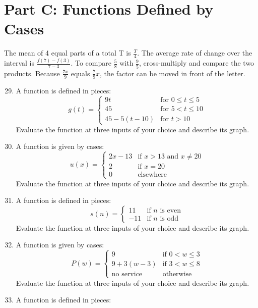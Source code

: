 \documentclass[11pt]{article}
\begin{document}
\section*{Part C: Functions Defined by Cases}
The mean of 4 equal parts of a total T is \label{eq050}$\frac{T}{4}$. The average rate of change over the interval is \label{eq051}$\frac{f(7) - f(3)}{7 - 3}$. To compare \label{eq052}$\frac{5}{8}$ with \label{eq053}$\frac{9}{5}$, cross-multiply and compare the two products. Because \label{eq054}$\frac{7x}{9}$ equals \label{eq055}$\frac{7}{9}x$, the factor can be moved in front of the letter.
\begin{enumerate}
\setcounter{enumi}{28}
\setlength{\itemsep}{8pt}
\item A function is defined in pieces:
\label{eq056}\[
  g(t) = \begin{cases} 9t & \text{for } 0 \le t \le 5 \\ 45 & \text{for } 5 < t \le 10 \\ 45 - 5(t - 10) & \text{for } t > 10 \end{cases}
\]
Evaluate the function at three inputs of your choice and describe its graph.
\item A function is given by cases:
\label{eq057}\[
  u(x) = \begin{cases} 2x - 13 & \text{if } x > 13 \text{ and } x \ne 20 \\ 2 & \text{if } x = 20 \\ 0 & \text{elsewhere} \end{cases}
\]
Evaluate the function at three inputs of your choice and describe its graph.
\item A function is defined in pieces:
\label{eq058}\[
  s(n) = \begin{cases} 11 & \text{if } n \text{ is even} \\ -11 & \text{if } n \text{ is odd} \end{cases}
\]
Evaluate the function at three inputs of your choice and describe its graph.
\item A function is given by cases:
\label{eq059}\[
  P(w) = \begin{cases} 9 & \text{if } 0 < w \le 3 \\ 9 + 3(w - 3) & \text{if } 3 < w \le 8 \\ \text{no service} & \text{otherwise} \end{cases}
\]
Evaluate the function at three inputs of your choice and describe its graph.
\item A function is defined in pieces:

\end{enumerate}
\end{document}
